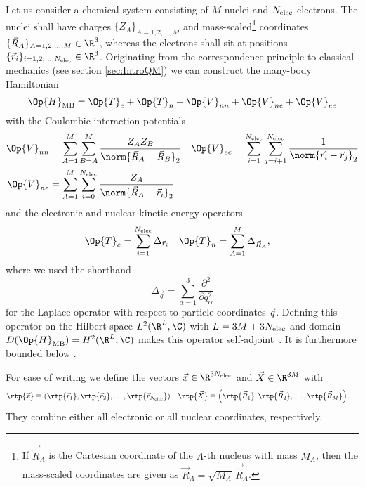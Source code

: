 Let us consider a chemical system consisting of $M$ nuclei
and $N_\text{elec}$ electrons.
The nuclei shall have charges $\{Z_A\}_{A = 1, 2, \ldots, M}$
and mass-scaled\footnote{
	If $\vec{\tilde{R}}_A$ is the Cartesian coordinate
	of the $A$-th nucleus with mass $M_A$, then
	the mass-scaled coordinates are given as
	$\vec{R}_A = \sqrt{M_A} \, \vec{\tilde{R}}_A$.
} coordinates $\{\vec{R}_A\}_{A = 1, 2, \ldots, M} \in \R^3$,
whereas the electrons shall sit
at positions $\{\vec{r}_i\}_{i = 1, 2, \ldots, \Nelec} \in \R^3$.
Originating from the correspondence principle to classical mechanics
(see section \vref{sec:IntroQM})
we can construct the many-body Hamiltonian
\begin{equation}
	\Op{H}_\text{MB} = \Op{T}_e + \Op{T}_n + \Op{V}_{nn} + \Op{V}_{ne} + \Op{V}_{ee}
	\label{eqn:ManyBodyHamiltonian}
\end{equation}
with the Coulombic interaction potentials
\begin{align}
	\label{eqn:ManyBodyHamiltonianPotential}
	\Op{V}_{nn} &= \sum_{A=1}^M \sum_{B=A}^M
		\frac{Z_A Z_B}{\norm{\vec{R}_A - \vec{R}_B}_2} &
	\Op{V}_{ee} &= \sum_{i=1}^{\Nelec} \sum_{j=i+1}^{\Nelec}
		\frac{1}{\norm{\vec{r}_i - \vec{r}_j}_2} \\
	\nonumber
	\Op{V}_{ne} &= \sum_{A=1}^M \sum_{i=0}^{\Nelec} \frac{Z_A}{\norm{\vec{R}_A - \vec{r}_i}_2}
\end{align}
and the electronic and nuclear kinetic energy operators
\begin{align}
	\label{eqn:ManyBodyHamiltonianKinetic}
	\Op{T}_e &= \sum_{i=1}^{\Nelec} \Delta_{\vec{r}_i} &
	\Op{T}_n &= \sum_{A=1}^M \Delta_{\vec{R}_A},
\end{align}
where we used the shorthand
\[ \Delta_{\vec{q}} = \sum_{\alpha=1}^3 \frac{\partial^2}{\partial q_\alpha^2} \]
for the Laplace operator with respect to particle coordinates $\vec{q}$.
Defining this operator on the Hilbert space $L^2(\R^L, \C)$
with $L = 3M+3N_\text{elec}$ and domain $D(\Op{H}_\text{MB}) = H^2(\R^L, \C)$
makes this operator self-adjoint~\cite{Kato1951}.
It is furthermore bounded below \cite{Kato1951}.

For ease of writing we define the vectors $\vec{x} \in \R^{3\Nelec}$
and $\vec{X} \in \R^{3M}$ with
\begin{align}
	\rtp{\vec{x}} &\equiv \left(\rtp{\vec{r}_1}, \rtp{\vec{r}_2}, \ldots, \rtp{\vec{r}_{\Nelec}}\right)
	&
	\rtp{\vec{X}} &\equiv \left(\rtp{\vec{R}_1}, \rtp{\vec{R}_2}, \ldots, \rtp{\vec{R}_{M}}\right).
	\label{eqn:DefAllCoords}
\end{align}
They combine either all electronic or all nuclear coordinates, respectively.

